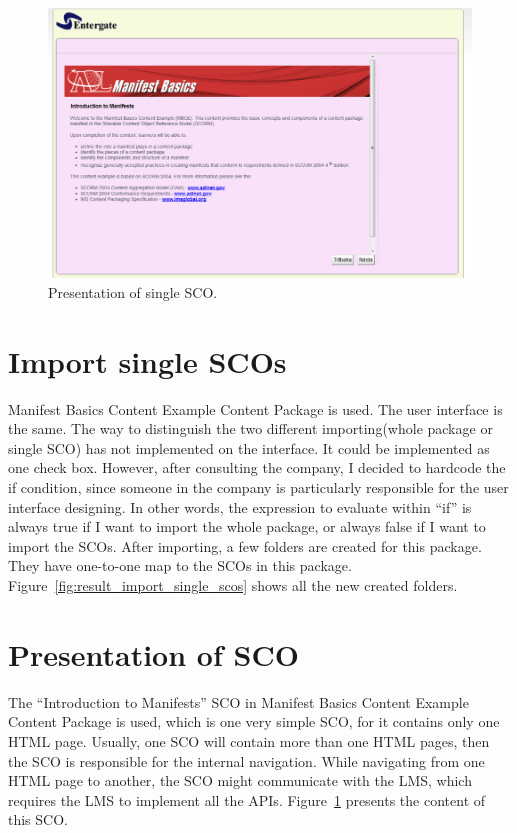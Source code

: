 \begin{figure}[b]
	\begin{center}
		\includegraphics[scale=0.3]{result_presentation_sco.png}
	\end{center}
	\caption{Presentation of single SCO.}
	\label{fig:result_presentation_sco}
\end{figure}
\section{Import single SCOs}
Manifest Basics Content Example Content Package \cite{mbce_package} is used. The user interface is the same. The way to distinguish the two different 
importing(whole package or single SCO) has not implemented on the interface. It could be implemented as one check box. However, after consulting the 
company, I decided to hardcode the if condition, since someone in the company is particularly responsible for the user interface designing. In other 
words, the expression to evaluate within ``if'' is always true if I want to import the whole package, or always false if I want to import the SCOs.
After importing, a few folders are created for this package. They have one-to-one map to the SCOs in this package. 
Figure~\ref{fig:result_import_single_scos} shows all the new created folders.
\section{Presentation of SCO}
The ``Introduction to Manifests'' SCO in Manifest Basics Content Example Content Package \cite{mbce_package} is used, which is one very simple SCO, 
for it contains only one HTML page. Usually, one SCO will contain more than one HTML pages, then the SCO is responsible for the internal navigation. 
While navigating from one HTML page to another, the SCO might communicate with the LMS, which requires the LMS to implement all the APIs.
Figure~\ref{fig:result_presentation_sco} presents the content of this SCO.

